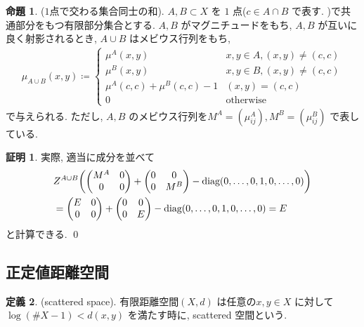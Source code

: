 \documentclass[10pt, fleqn, label-section=none]{bxjsarticle}
\theoremstyle{definition}
\newtheorem{dfn}{定義}[section]
\newtheorem{prop}[dfn]{命題}
\newtheorem*{pf*}{証明}
\newcommand{\paren}[1]{\mleft( #1\mright )}
\newcommand{\diag}{\textrm{diag}}
\renewcommand{\;}{\, ; \,}
\newcommand{\gyouretsu}[1]{\begin{pmatrix} #1 \end{pmatrix} }
\begin{document}
\begin{prop}($1$点で交わる集合同士の和). $A, B \subset X$ を $1$ 点($c \in A\cap B$ で表す. )で共通部分をもつ有限部分集合とする. $A, B$ がマグニチュードをもち, $A, B$ が互いに良く射影されるとき, $A \cup B$ はメビウス行列をもち, 
\begin{align*} \mu_{A \cup B}( x, y) \coloneqq \begin{cases} \mu^A(x, y)  & x, y \in A, (x, y) \neq  (c, c) \\ \mu^B(x, y)  & x, y \in B , (x, y) \neq  (c, c) \\ \mu^A(c, c) + \mu^B (c, c) - 1 & (x, y) = (c, c)  \\ 0 & \textrm{otherwise} \end{cases} \end{align*}
で与えられる. ただし, $A, B$ のメビウス行列を$M^A = (\mu^A_{ij}), M^B = (\mu^B_{ij})$ で表している. 

\end{prop}
\begin{pf*}実際, 適当に成分を並べて
\begin{align*} &Z^{A\cup B} \paren{ \gyouretsu{ M^A & 0 \\ 0 & 0   } + \gyouretsu{ 0 & 0 \\ 0 & M^B   } - \diag(0, \ldots ,0,  1 , 0, \ldots , 0) }  \\ & =   \gyouretsu{ E & 0 \\ 0 & 0   } +  \gyouretsu{ 0 & 0 \\ 0 & E   } -  \diag(0, \ldots ,0,  1 , 0, \ldots , 0)  = E \end{align*}
と計算できる. 
\qed
\end{pf*}



\subsection{正定値距離空間}


\begin{dfn}(scattered space). 有限距離空間$(X, d)$ は任意の$x, y \in X$ に対して$\log(\# X - 1) < d(x, y)$ を満たす時に, scattered 空間という. 

\end{dfn}
\end{document}
